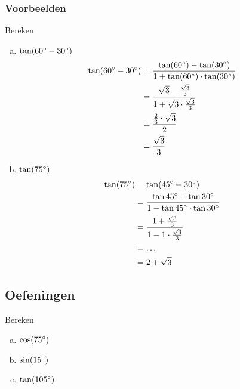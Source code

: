 \documentclass[a4paper,12pt]{article}
\begin{document}
\begin{theorie}
\subsubsection*{Voorbeelden}
Bereken
\begin{enumerate}[(a)]
  \item $\tan(60^\circ - 30^\circ)$
  \vspace*{-0.5cm}
  \begin{align*}
    \tan(60^\circ - 30^\circ)&=\dfrac{\tan(60^\circ)-\tan(30^\circ)}{1+\tan(60^\circ)\cdot\tan(30^\circ)}\\
                               &=\dfrac{\sqrt{3}-\frac{\sqrt{3}}{3}}{1+\sqrt{3}\cdot\frac{\sqrt{3}}{3}}\\
                               &=\dfrac{\frac{2}{3}\cdot\sqrt{3}}{2}\\
                               &=\dfrac{\sqrt{3}}{3}
  \end{align*}
  \item $\tan(75^\circ)$
  \vspace*{-0.5cm}
  \begin{align*}
    \tan(75^\circ) &= \tan(45^\circ + 30^\circ)\\
                    &= \dfrac{\tan45^\circ+\tan30^\circ}{1-\tan45^\circ\cdot\tan30^\circ}\\
                    &= \dfrac{1+\frac{\sqrt{3}}{3}}{1-1\cdot\frac{\sqrt{3}}{3}}\\
                    &= \ldots\\
                    &= 2+\sqrt{3}
  \end{align*}
\end{enumerate}


\subsection{Oefeningen}

\end{theorie}

\begin{oefening}
Bereken
\begin{multicols}{3}
\begin{enumerate}[(a)]
  \item $\cos(75^\circ)$
  \item $\sin(15^\circ)$
  \item $\tan(105^\circ)$
\end{enumerate}
\end{multicols}
\end{oefening}
\end{document}
